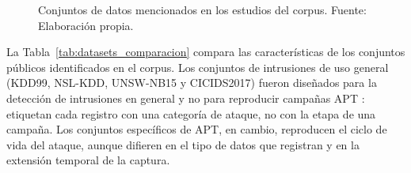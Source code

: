 \begin{figure}[h!]
\centering
{}
\caption{Conjuntos de datos mencionados en los estudios del corpus. Fuente: Elaboración propia.}
\label{fig:datasets}
\end{figure}
\FloatBarrier

La Tabla~\ref{tab:datasets_comparacion} compara las características de los conjuntos públicos identificados en el corpus. Los conjuntos de intrusiones de uso general (KDD99, NSL-KDD, UNSW-NB15 y CICIDS2017) fueron diseñados para la detección de intrusiones en general y no para reproducir campañas APT \parencite{benabderrahmane_ranking-enhanced_2025}: etiquetan cada registro con una categoría de ataque, no con la etapa de una campaña. Los conjuntos específicos de APT, en cambio, reproducen el ciclo de vida del ataque, aunque difieren en el tipo de datos que registran y en la extensión temporal de la captura.

